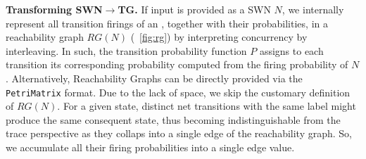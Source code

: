 \medskip

\textbf{Transforming SWN$\to$TG.} If input is provided as a SWN $N$,  we internally represent all transition firings of an \uswn, together with their probabilities, in a reachability graph $RG(N)$ (\figurename~\ref{fig:rg}) by interpreting concurrency by interleaving. In such, the transition probability function $P$ assigns to each transition its corresponding probability computed from the firing probability of $N$. Alternatively, Reachability Graphs can be directly provided via the \texttt{PetriMatrix} format. Due to the lack of space, we skip the customary definition of $RG(N)$.
For a given state, distinct net transitions with the same label might produce the same consequent state, thus becoming indistinguishable from the trace perspective as they collaps into a single edge of the reachability graph. So, we accumulate all their firing probabilities into a single edge value. 
